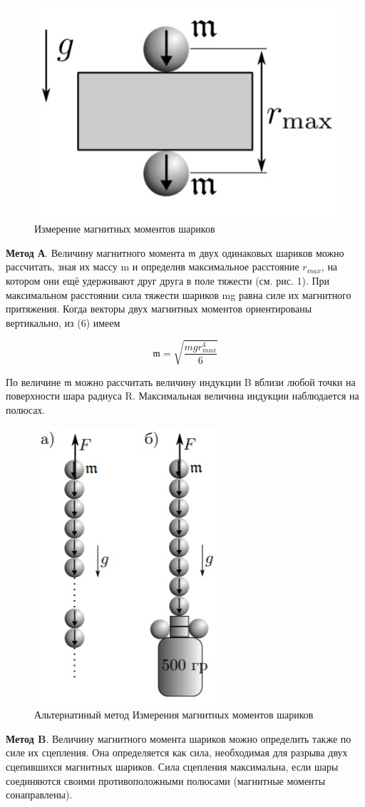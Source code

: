 \documentclass[a4paper,12pt]{article}
\begin{document}
\begin{figure}
\includegraphics[width = 5 cm]{fig1}
\caption{Измерение магнитных моментов шариков}
\end{figure}

\textbf{Метод А}. Величину магнитного момента $\mathfrak{m}$ двух
одинаковых шариков можно рассчитать, зная их
массу m и определив максимальное расстояние $r_{max}$,
на котором они ещё удерживают друг друга в поле
тяжести (см. рис. 1). При максимальном расстоянии
сила тяжести шариков mg равна силе их магнитного
притяжения. Когда векторы двух магнитных моментов ориентированы вертикально, из (6) имеем

\begin{equation}
	\mathfrak{m} = \sqrt{\frac{mgr^4_{max}}{6}}
\end{equation}

По величине $\mathfrak{m}$ можно рассчитать величину индукции B вблизи любой точки на поверхности шара радиуса R. Максимальная величина индукции наблюдается на полюсах.


\begin{figure}
\includegraphics[width = 5 cm, height = 6 cm]{fig2}
\caption{Альтернатиный метод Измерения магнитных моментов шариков}
\end{figure}

\vspace{0.3 cm}

\textbf{Метод B}. Величину магнитного момента шариков можно определить также по силе их сцепления. Она определяется как сила, необходимая для разрыва двух сцепившихся магнитных шариков. Сила сцепления
максимальна, если шары соединяются своими противоположными полюсами (магнитные моменты сонаправлены).
\end{document}
